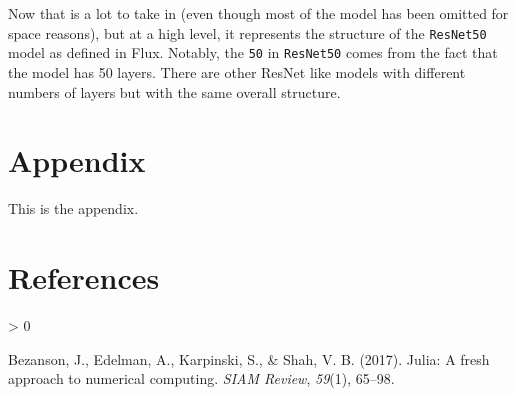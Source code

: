 \documentclass[
  notoc %
]{tufte-book}
\newcommand{\passthrough}[1]{#1}
\newlength{\cslhangindent}
\newenvironment{CSLReferences}[2] %
 {%
  \setlength{\parindent}{0pt}
  \ifodd #1 \everypar{\setlength{\hangindent}{\cslhangindent}}\ignorespaces\fi
  \ifnum #2 > 0
  \setlength{\parskip}{#2\baselineskip}
  \fi
 }%
 {}
\begin{document}
Now that is a lot to take in (even though most of the model has been
omitted for space reasons), but at a high level, it represents the
structure of the \passthrough{\lstinline!ResNet50!} model as defined in
Flux. Notably, the \passthrough{\lstinline!50!} in
\passthrough{\lstinline!ResNet50!} comes from the fact that the model
has 50 layers. There are other ResNet like models with different numbers
of layers but with the same overall structure.

\hypertarget{appendix}{%
\chapter*{Appendix}\label{appendix}}

This is the appendix.

\hypertarget{references}{%
\chapter*{References}\label{references}}

\hypertarget{refs}{}
\begin{CSLReferences}{1}{0}
\leavevmode\hypertarget{ref-bezanson2017julia}{}%
Bezanson, J., Edelman, A., Karpinski, S., \& Shah, V. B. (2017). Julia:
A fresh approach to numerical computing. \emph{SIAM Review},
\emph{59}(1), 65--98.

\end{CSLReferences}

\backmatter
\end{document}
